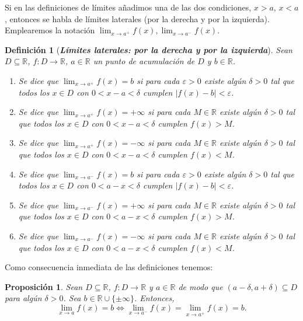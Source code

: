 \documentclass[12pt]{article}
\newtheorem{proposition}[theorem]{Proposición}
\newtheorem{definition}[theorem]{Definición}
\begin{document}
Si en las definiciones de límites añadimos una de las dos condiciones, $x>a$, $x <a$, entonces se habla de límites laterales (por la derecha y por la izquierda). Emplearemos la notación $\lim_{x \rightarrow a^+} f(x), \lim_{x \rightarrow a^-} f(x)$.

\begin{definition}[\textbf{\textit{Límites laterales: por la derecha y por la izquierda}}]
Sean $D \subseteq \mathbb{R}$, $f \colon D \longrightarrow \mathbb{R}$, $a \in \mathbb{R}$ un punto de acumulación de $D$ y $b \in \mathbb{R}$.
\begin{enumerate}
\item Se dice que $\lim_{x \rightarrow a^+}f(x) = b$ si para cada $\varepsilon >0$ existe algún $\delta >0$ tal que todos los $x \in D$ con $0< x-a < \delta$ cumplen $|f(x) -b | < \varepsilon$.
\item Se dice que $\lim_{x \rightarrow a^+}f(x) = +\infty$ si para cada $M \in \mathbb{R}$ existe algún $\delta >0$ tal que todos los $x \in D$ con $0< x-a < \delta$ cumplen $f(x) >M$.
\item Se dice que $\lim_{x \rightarrow a^+}f(x) = -\infty$ si para cada $M \in \mathbb{R}$ existe algún $\delta >0$ tal que todos los $x \in D$ con $0< x-a < \delta$ cumplen $f(x) <M$.
\item Se dice que $\lim_{x \rightarrow a^-}f(x) = b$ si para cada $\varepsilon >0$ existe algún $\delta >0$ tal que todos los $x \in D$ con $0< a-x < \delta$ cumplen $|f(x) -b | < \varepsilon$.
\item Se dice que $\lim_{x \rightarrow a^-}f(x) = +\infty$ si para cada $M \in \mathbb{R}$ existe algún $\delta >0$ tal que todos los $x \in D$ con $0< a-x < \delta$ cumplen $f(x) >M$.
\item Se dice que $\lim_{x \rightarrow a^-}f(x) = -\infty$ si para cada $M \in \mathbb{R}$ existe algún $\delta >0$ tal que todos los $x \in D$ con $0< a-x < \delta$ cumplen $f(x) <M$.
\end{enumerate}
\end{definition}

Como consecuencia inmediata de las definiciones tenemos: 

\begin{proposition}Sean $D \subseteq \mathbb{R}$, $f \colon D \longrightarrow \mathbb{R}$ y $a \in \mathbb{R}$ de modo que $(a - \delta, a+ \delta) \subseteq D$ para algún $\delta >0$. Sea $b \in \mathbb{R} \cup \lbrace \pm \infty \rbrace$. Entonces, $$\lim_{x \rightarrow a}f(x) = b \Longleftrightarrow \lim_{x\rightarrow a^-}f(x) = \lim_{x \rightarrow a^+} f(x) = b.$$
\end{proposition}
\end{document}
